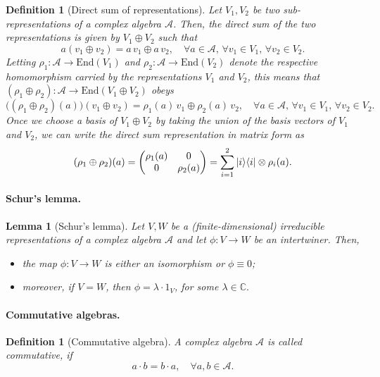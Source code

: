\documentclass[12pt]{article}
\theoremstyle{plain}
\newtheorem{lemma}[theorem]{Lemma}
\newtheorem{definition}[theorem]{Definition}
\newcommand{\proj}[1]{\ket{#1}\!\bra{#1}}
\begin{document}
\begin{definition}[Direct sum of representations]\label{def:direct-sum-repr}
Let $V_1,V_2$ be two sub-representations of a complex algebra $\mathcal{A}$. Then, the direct sum of the two representations is given by $V_1 \oplus V_2$ such that
$$
a (v_1 \oplus v_2) = a \, v_1 \oplus a \, v_2, \quad \forall a \in \mathcal{A}, \,\forall v_1 \in V_1, \, \forall v_2 \in V_2.
$$
Letting $\rho_1: \mathcal{A} \rightarrow \mathrm{End}(V_1)$ and $\rho_2: \mathcal{A} \rightarrow \mathrm{End}(V_2)$ denote the respective homomorphism carried by the representations $V_1$ and $V_2$, this means that $(\rho_1 \oplus \rho_2): \mathcal{A} \rightarrow \mathrm{End}(V_1 \oplus V_2)$ obeys
$$
\big((\rho_1 \oplus \rho_2)(a)\big) (v_1 \oplus v_2) = \rho_1(a) \, v_1 \oplus \rho_2(a) \, v_2, \quad \forall a \in \mathcal{A}, \,\forall v_1 \in V_1, \, \forall v_2 \in V_2.
$$
Once we choose a basis of $V_1 \oplus V_2$ by taking the union of the basis vectors of $V_1$ and $V_2$, we can write the direct sum representation in matrix form as
$$
(\rho_1 \oplus \rho_2)(a) =
\begin{pmatrix}
\rho_1(a) & 0\\
0 & \rho_2(a)
\end{pmatrix} = \sum_{i=1}^2 \proj{i} \otimes \rho_i(a).
$$ 
\end{definition}

\paragraph{Schur's lemma.}

\begin{lemma}[Schur's lemma]\label{lem:schur}
Let $V,W$ be a (finite-dimensional) irreducible representations of a complex algebra $\mathcal{A}$ and let $\phi: V \rightarrow W$ be an intertwiner. Then, 
\begin{itemize}
    \item the map $\phi: V \rightarrow W$ is either an isomorphism or $\phi \equiv 0$;
    \item moreover, if $V=W$, then $\phi = \lambda \cdot 1_V$, for some $\lambda \in \mathbb{C}.
$
\end{itemize}
\end{lemma}


\paragraph{Commutative algebras.}

\begin{definition}[Commutative algebra]
A complex algebra $\mathcal{A}$ is called commutative, if
$$
a \cdot b = b \cdot a, \quad \forall a,b \in \mathcal{A}.
$$
\end{definition}
\end{document}

